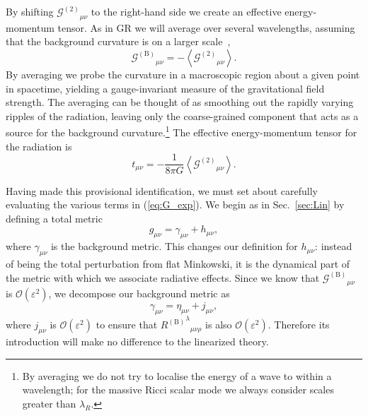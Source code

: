\documentclass[aps,prd,amsfonts,amssymb,amsmath,nofootinbib,reprint,showpacs]{revtex4-1}
\newcommand{\eqnref}[1]{(\ref{eq:#1})}
\newcommand{\secref}[1]{Sec.\ \ref{sec:#1}}
\newcommand{\recip}[1]{\ensuremath{\frac{1}{#1}}}
\newcommand{\order}[1]{\ensuremath{\mathcal{O}({#1})}}
\begin{document}
By shifting ${\mathcal{G}^{(2)}}_{\mu\nu}$ to the right-hand side we create an effective energy-momentum tensor. As in GR we will average over several wavelengths, assuming that the background curvature is on a larger scale~\cite{Misner1973, Stein2011},
\begin{equation}
{\mathcal{G}^{(\text{B})}}_{\mu\nu} = -\left\langle{\mathcal{G}^{(2)}}_{\mu\nu}\right\rangle.
\end{equation}
By averaging we probe the curvature in a macroscopic region about a given point in spacetime, yielding a gauge-invariant measure of the gravitational field strength. The averaging can be thought of as smoothing out the rapidly varying ripples of the radiation, leaving only the coarse-grained component that acts as a source for the background curvature.\footnote{By averaging we do not try to localise the energy of a wave to within a wavelength; for the massive Ricci scalar mode we always consider scales greater than $\lambda_R$.} The effective energy-momentum tensor for the radiation is
\begin{equation}
t_{\mu\nu} = -\recip{8\pi G}\left\langle{\mathcal{G}^{(\text{2})}}_{\mu\nu}\right\rangle.
\end{equation}

Having made this provisional identification, we must set about carefully evaluating the various terms in \eqnref{G_exp}. We begin as in \secref{Lin} by defining a total metric
\begin{equation}
g_{\mu\nu} = \gamma_{\mu\nu} + h_{\mu\nu},
\end{equation}
where $\gamma_{\mu\nu}$ is the background metric. This changes our definition for $h_{\mu\nu}$: instead of being the total perturbation from flat Minkowski, it is the dynamical part of the metric with which we associate radiative effects. Since we know that ${\mathcal{G}^{(\text{B})}}_{\mu\nu}$ is $\order{\varepsilon^2}$, we decompose our background metric as
\begin{equation}
\gamma_{\mu\nu} = \eta_{\mu\nu} + j_{\mu\nu},
\end{equation}
where $j_{\mu\nu}$ is $\order{\varepsilon^2}$ to ensure that ${{R^{(\text{B})}}^\lambda}_{\mu\nu\rho}$ is also $\order{\varepsilon^2}$. Therefore its introduction will make no difference to the linearized theory.
\end{document}
